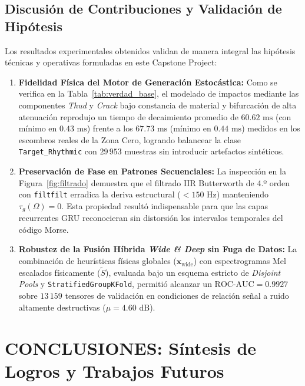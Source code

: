 \documentclass[11pt, a4paper]{article}
\begin{document}
\subsection{Discusión de Contribuciones y Validación de Hipótesis}
Los resultados experimentales obtenidos validan de manera integral las hipótesis técnicas y operativas formuladas en este Capstone Project:
\begin{enumerate}
    \item \textbf{Fidelidad Física del Motor de Generación Estocástica:} Como se verifica en la Tabla~\ref{tab:verdad_base}, el modelado de impactos mediante las componentes \textit{Thud} y \textit{Crack} bajo constancia de material y bifurcación de alta atenuación reprodujo un tiempo de decaimiento promedio de $60.62\text{ ms}$ (con mínimo en $0.43\text{ ms}$) frente a los $67.73\text{ ms}$ (mínimo en $0.44\text{ ms}$) medidos en los escombros reales de la Zona Cero, logrando balancear la clase \texttt{Target\_Rhythmic} con $29\,953$ muestras sin introducir artefactos sintéticos.
    \item \textbf{Preservación de Fase en Patrones Secuenciales:} La inspección en la Figura~\ref{fig:filtrado} demuestra que el filtrado IIR Butterworth de 4.º orden con \texttt{filtfilt} erradica la deriva estructural ($<150\text{ Hz}$) manteniendo $\tau_g(\Omega) = 0$. Esta propiedad resultó indispensable para que las capas recurrentes GRU reconocieran sin distorsión los intervalos temporales del código Morse.
    \item \textbf{Robustez de la Fusión Híbrida \textit{Wide \& Deep} sin Fuga de Datos:} La combinación de heurísticas físicas globales ($\mathbf{x}_{\text{wide}}$) con espectrogramas Mel escalados físicamente ($\tilde{S}$), evaluada bajo un esquema estricto de \textit{Disjoint Pools} y \texttt{StratifiedGroupKFold}, permitió alcanzar un $\text{ROC-AUC} = 0.9927$ sobre $13\,159$ tensores de validación en condiciones de relación señal a ruido altamente destructivas ($\mu = 4.60\text{ dB}$).
\end{enumerate}

\section{CONCLUSIONES: Síntesis de Logros y Trabajos Futuros}
\end{document}
